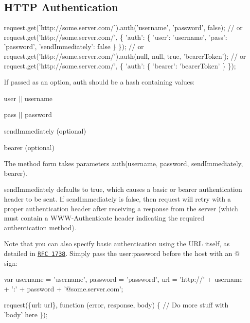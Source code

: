 \subsection*{H\+T\+TP Authentication}


\begin{DoxyCode}
request.get('http://some.server.com/').auth('username', 'password', false);
// or
request.get('http://some.server.com/', \{
  'auth': \{
    'user': 'username',
    'pass': 'password',
    'sendImmediately': false
  \}
\});
// or
request.get('http://some.server.com/').auth(null, null, true, 'bearerToken');
// or
request.get('http://some.server.com/', \{
  'auth': \{
    'bearer': 'bearerToken'
  \}
\});
\end{DoxyCode}


If passed as an option, {\ttfamily auth} should be a hash containing values\+:


\begin{DoxyItemize}
\item {\ttfamily user} $\vert$$\vert$ {\ttfamily username}
\item {\ttfamily pass} $\vert$$\vert$ {\ttfamily password}
\item {\ttfamily send\+Immediately} (optional)
\item {\ttfamily bearer} (optional)
\end{DoxyItemize}

The method form takes parameters {\ttfamily auth(username, password, send\+Immediately, bearer)}.

{\ttfamily send\+Immediately} defaults to {\ttfamily true}, which causes a basic or bearer authentication header to be sent. If {\ttfamily send\+Immediately} is {\ttfamily false}, then {\ttfamily request} will retry with a proper authentication header after receiving a {} response from the server (which must contain a {\ttfamily W\+W\+W-\/\+Authenticate} header indicating the required authentication method).

Note that you can also specify basic authentication using the U\+RL itself, as detailed in \href{http://www.ietf.org/rfc/rfc1738.txt}{\tt R\+FC 1738}. Simply pass the {\ttfamily user\+:password} before the host with an {\ttfamily @} sign\+:


\begin{DoxyCode}
var username = 'username',
    password = 'password',
    url = 'http://' + username + ':' + password + '@some.server.com';

request(\{url: url\}, function (error, response, body) \{
   // Do more stuff with 'body' here
\});
\end{DoxyCode}


